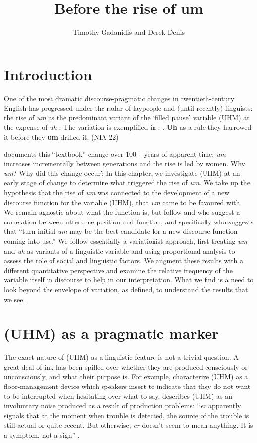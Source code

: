 \documentclass[11pt]{article}
\title{Before the rise of um}
\author{Timothy Gadanidis and Derek Denis}
\begin{document}
\maketitle

\section{Introduction}

One of the most dramatic discourse-pragmatic changes in twentieth-century
English has progressed under the radar of laypeople and (until recently)
linguists: the rise of \emph{um} as the predominant variant of the `filled
pause' variable (UHM) at the expense of \emph{uh} \parencite{tottie2011,
fruehwald2016, wielingetal2016}.
The variation is exemplified in \Next.
\ex. \textbf{Uh} as a rule they harrowed it before they \textbf{um} drilled it.
\hfill (NIA-22)

\textcite[43]{fruehwald2016} documents this ``textbook'' change over 100+ years
of apparent time:
\emph{um} increases incrementally between generations and the rise is led by
women.
Why \emph{um}? Why did this change occur?
In this chapter, we investigate (UHM) at an early stage of change to determine
what triggered the rise of \emph{um}.
We take up the hypothesis that the rise of \emph{um} was connected to the
development of a new discourse function for the variable (UHM), that \emph{um}
came to be favoured with.
We remain agnostic about what the function is, but follow \textcite{tottie2016}
and \textcite{fruehwald2016} who suggest a correlation between utterance
position and function; and specifically \textcite[46]{fruehwald2016} who suggests
that ``turn-initial \emph{um} may be the best candidate for a new
discourse function coming into use.''
We follow essentially a variationist approach, first treating \emph{um} and
\emph{uh} as variants of a linguistic variable and using proportional analysis
to assess the role of social and linguistic factors.
We augment these results with a different quantitative perspective and examine
the relative frequency of the variable itself in discourse to help in our
interpretation.
What we find is a need to look beyond the envelope of variation, as defined, to
understand the results that we see.

\section{(UHM) as a pragmatic marker}

The exact nature of (UHM) as a linguistic feature is not a trivial question.
A great deal of ink has been spilled over whether they are produced consciously
or unconsciously, and what their purpose is.
For example, \textcite[41--42]{maclayosgood1959} characterize (UHM) as a
floor-management device which speakers insert to indicate that they do not want
to be interrupted when hesitating over what to say.
\textcite{levelt1983, levelt1989} describes (UHM) as an involuntary noise
produced as a result of production problems: ``\emph{er} apparently signals that
at the moment when trouble is detected, the source of the trouble is still
actual or quite recent. But otherwise, \emph{er} doesn't seem to mean anything.
It is a symptom, not a sign'' \parencite[484]{levelt1989}.
\end{document}
